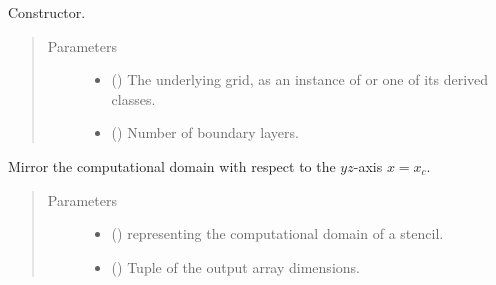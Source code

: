 \documentclass[letterpaper,10pt,english]{sphinxmanual}
\begin{document}
\begin{fulllineitems}
\begin{fulllineitems}
\label{\detokenize{api:dycore.horizontal_boundary_relaxed.RelaxedSymmetricYZ.__init__}}
Constructor.
\begin{quote}\begin{description}
\item[{Parameters}] \leavevmode\begin{itemize}
\item {} 
 () \textendash{} The underlying grid, as an instance of {\hyperref[\detokenize{api:grids.grid_xyz.GridXYZ}]{}} or one of its derived classes.

\item {} 
 () \textendash{} Number of boundary layers.

\end{itemize}

\end{description}\end{quote}

\end{fulllineitems}


\begin{fulllineitems}
\label{\detokenize{api:dycore.horizontal_boundary_relaxed.RelaxedSymmetricYZ.from_computational_to_physical_domain}}
Mirror the computational domain with respect to the \(yz\)-axis \(x = x_c\).
\begin{quote}\begin{description}
\item[{Parameters}] \leavevmode\begin{itemize}
\item {} 
 () \textendash{}  representing the computational domain of a stencil.

\item {} 
 () \textendash{} Tuple of the output array dimensions.


\end{itemize}
\end{description}
\end{quote}
\end{fulllineitems}
\end{fulllineitems}
\end{document}
